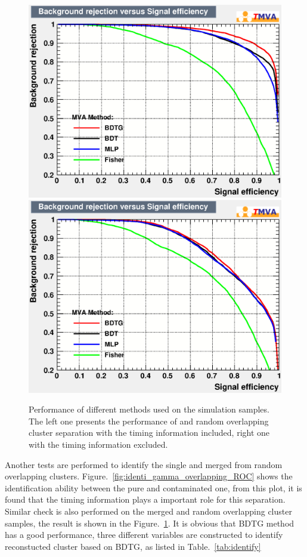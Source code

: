 \begin{figure}[!htb]
  \begin{center}
    \includegraphics[width=0.49\linewidth]{Figures/06_ECAL/fast_sim/Identification/piz_combine/with_time/rejBvsS.eps} 
    \includegraphics[width=0.49\linewidth]{Figures/06_ECAL/fast_sim/Identification/piz_combine/no_time/rejBvsS.eps}
    \vspace*{-0.5cm}
  \end{center}
  \caption{
   Performance of different methods used on the simulation samples.
   The left one presents the performance of \piz and random overlapping cluster separation with the timing information included, 
   right one with the timing information excluded.
  }
  \label{fig:identi_piz_overlapping_ROC}
\end{figure}

Another tests are performed to identify the single \g and merged \piz from random overlapping clusters.
Figure.~\ref{fig:identi_gamma_overlapping_ROC} shows the identification ability between the pure \g and contaminated one,
from this plot, 
it is found that the timing information plays a important role for this separation.
Similar check is also performed on the merged \piz and random overlapping cluster samples,
the result is shown in the Figure.~\ref{fig:identi_piz_overlapping_ROC}.
It is obvious that BDTG method has a good performance,
three different variables are constructed to identify reconstucted cluster based on BDTG,
as listed in Table.~\ref{tab:identify}


